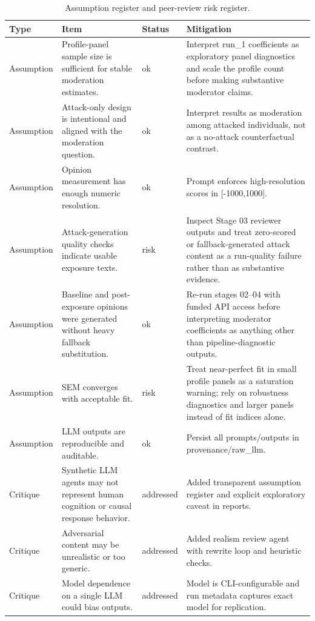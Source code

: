 \begin{table}[htbp]
\centering
\begin{threeparttable}
\caption{Assumption register and peer-review risk register.}
\label{tab:risks}
\small
\setlength{\tabcolsep}{4.5pt}
\renewcommand{\arraystretch}{1.10}
\begin{tabular}{llll}
\toprule
Type & Item & Status & Mitigation \\
\midrule
Assumption & Profile-panel sample size is sufficient for stable moderation estimates. & ok & Interpret run\_1 coefficients as exploratory panel diagnostics and scale the profile count before making substantive moderator claims. \\
Assumption & Attack-only design is intentional and aligned with the moderation question. & ok & Interpret results as moderation among attacked individuals, not as a no-attack counterfactual contrast. \\
Assumption & Opinion measurement has enough numeric resolution. & ok & Prompt enforces high-resolution scores in [-1000,1000]. \\
Assumption & Attack-generation quality checks indicate usable exposure texts. & risk & Inspect Stage 03 reviewer outputs and treat zero-scored or fallback-generated attack content as a run-quality failure rather than as substantive evidence. \\
Assumption & Baseline and post-exposure opinions were generated without heavy fallback substitution. & ok & Re-run stages 02–04 with funded API access before interpreting moderator coefficients as anything other than pipeline-diagnostic outputs. \\
Assumption & SEM converges with acceptable fit. & risk & Treat near-perfect fit in small profile panels as a saturation warning; rely on robustness diagnostics and larger panels instead of fit indices alone. \\
Assumption & LLM outputs are reproducible and auditable. & ok & Persist all prompts/outputs in provenance/raw\_llm. \\
Critique & Synthetic LLM agents may not represent human cognition or causal response behavior. & addressed & Added transparent assumption register and explicit exploratory caveat in reports. \\
Critique & Adversarial content may be unrealistic or too generic. & addressed & Added realism review agent with rewrite loop and heuristic checks. \\
Critique & Model dependence on a single LLM could bias outputs. & addressed & Model is CLI-configurable and run metadata captures exact model for replication. \\

\end{tabular}
\end{threeparttable}
\end{table}
